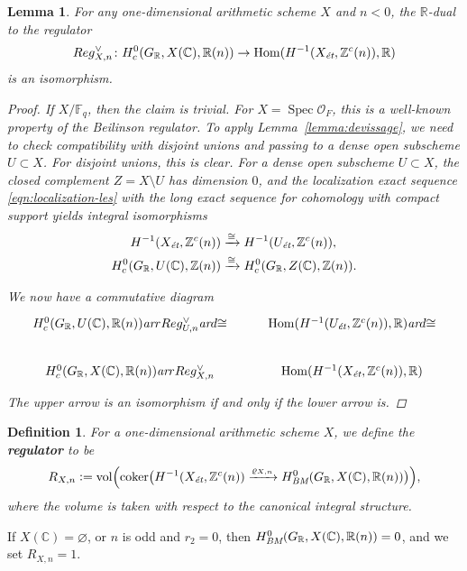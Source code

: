 \documentclass{article}
\DeclareMathOperator{\coker}{coker}
\DeclareMathOperator{\Hom}{Hom}
\DeclareMathOperator{\Spec}{Spec}
\DeclareMathOperator{\vol}{vol}
\newcommand{\CC}{\mathbb{C}}
\newcommand{\FF}{\mathbb{F}}
\newcommand{\RR}{\mathbb{R}}
\newcommand{\ZZ}{\mathbb{Z}}
\renewcommand{\emptyset}{\varnothing}
\newcommand{\ar}{\text{\it ar}}
\newcommand{\BM}{\text{\it BM}}
\newcommand{\et}{\text{\it \'{e}t}}
\newcommand{\dfn}{\mathrel{\mathop:}=}
\theoremstyle{myplain}
\newtheorem{lemma}[theorem]{Lemma}
\theoremstyle{mydefinition}
\newtheorem{definition}[theorem]{Definition}
\begin{document}
\begin{lemma}
  \label{lemma:regulator-isomorphism}
  For any one-dimensional arithmetic scheme $X$ and $n < 0$, the $\RR$-dual to
  the regulator
  \[ Reg_{X,n}^\vee\colon H^0_c (G_\RR, X(\CC), \RR(n)) \to
    \Hom (H^{-1} (X_\et, \ZZ^c (n)), \RR) \]
  is an isomorphism.

  \begin{proof}
    If $X/\FF_q$, then the claim is trivial. For $X = \Spec \mathcal{O}_F$, this
    is a well-known property of the Beilinson regulator. To apply
    Lemma~\ref{lemma:devissage}, we need to check compatibility with disjoint
    unions and passing to a dense open subscheme $U \subset X$. For disjoint
    unions, this is clear. For a dense open subscheme $U \subset X$, the closed
    complement $Z = X\setminus U$ has dimension $0$, and the localization exact
    sequence \eqref{eqn:localization-les} with the long exact sequence for
    cohomology with compact support yields integral isomorphisms
    \begin{align*}
      H^{-1} (X_\et, \ZZ^c (n)) & \xrightarrow{\cong} H^{-1} (U_\et, \ZZ^c (n)), \\
      H^0_c (G_\RR, U(\CC), \ZZ(n)) & \xrightarrow{\cong} H^0_c (G_\RR, Z(\CC), \ZZ(n)).
    \end{align*}

    We now have a commutative diagram
    \[ \begin{tikzcd}
        H^0_c (G_\RR, U(\CC), \RR(n)) \ar{r}{Reg_{U,n}^\vee} \ar{d}{\cong} &
        \Hom (H^{-1} (U_\et, \ZZ^c (n)), \RR) \ar{d}{\cong} \\
        H^0_c (G_\RR, X(\CC), \RR(n)) \ar{r}{Reg_{X,n}^\vee} &
        \Hom (H^{-1} (X_\et, \ZZ^c (n)), \RR)
      \end{tikzcd} \]
    The upper arrow is an isomorphism if and only if the lower arrow is.
  \end{proof}
\end{lemma}

\begin{definition}
  \label{dfn:regulator}
  For a one-dimensional arithmetic scheme $X$, we define the \textbf{regulator}
  to be
  \[ R_{X,n} \dfn \vol \Bigl(\coker \bigl(
    H^{-1} (X_\et, \ZZ^c (n)) \xrightarrow{\varrho_{X,n}}
    H^0_\BM (G_\RR, X(\CC), \RR(n))
    \bigr)\Bigr), \]
  where the volume is taken with respect to the canonical integral structure.
\end{definition}

If $X(\CC) = \emptyset$, or $n$ is odd and $r_2 = 0$, then
$H^0_\BM (G_\RR, X(\CC), \RR (n)) = 0$, and we set $R_{X,n} = 1$.
\end{document}
